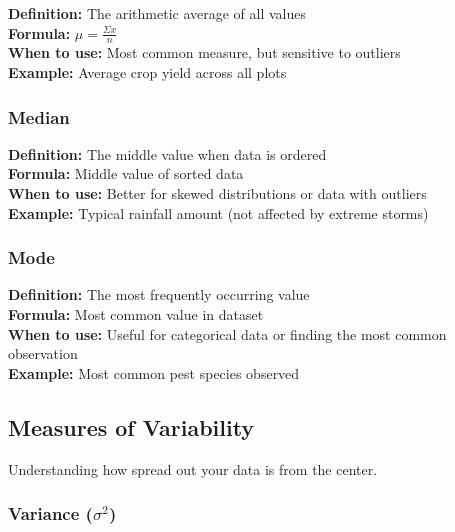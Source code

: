 \documentclass[11pt,a4paper]{article}
\begin{document}
\begin{formulabox}
\textbf{Definition:} The arithmetic average of all values\\[0.3cm]
\textbf{Formula:} $\mu = \frac{\Sigma x}{n}$\\[0.3cm]
\textbf{When to use:} Most common measure, but sensitive to outliers\\
\textbf{Example:} Average crop yield across all plots
\end{formulabox}

\subsubsection{Median}

\begin{formulabox}
\textbf{Definition:} The middle value when data is ordered\\[0.3cm]
\textbf{Formula:} Middle value of sorted data\\[0.3cm]
\textbf{When to use:} Better for skewed distributions or data with outliers\\
\textbf{Example:} Typical rainfall amount (not affected by extreme storms)
\end{formulabox}

\subsubsection{Mode}

\begin{formulabox}
\textbf{Definition:} The most frequently occurring value\\[0.3cm]
\textbf{Formula:} Most common value in dataset\\[0.3cm]
\textbf{When to use:} Useful for categorical data or finding the most common observation\\
\textbf{Example:} Most common pest species observed
\end{formulabox}

\subsection{Measures of Variability}

Understanding how spread out your data is from the center.

\subsubsection{\texorpdfstring{Variance ($\sigma^2$)}{Variance (sigma-squared)}}
\end{document}

